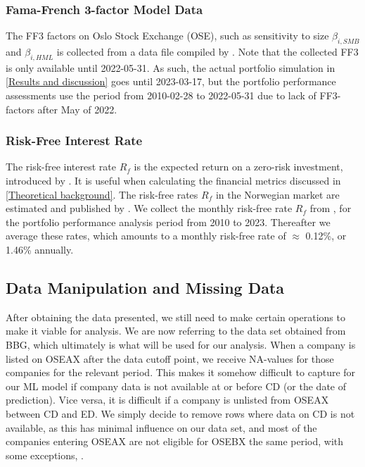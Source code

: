 \subsubsection{Fama-French 3-factor Model Data}

The FF3 factors on Oslo Stock Exchange (OSE), such as sensitivity to size $\beta_{i,SMB}$ and $\beta_{i,HML}$ is collected from a data file compiled by \textcite{bernt-fama-french}. Note that the collected FF3 is only available until 2022-05-31. As such, the actual portfolio simulation in \autoref{Results and discussion} goes until 2023-03-17, but the portfolio performance assessments use the period from 2010-02-28 to 2022-05-31 due to lack of FF3-factors after May of 2022.

\subsubsection{Risk-Free Interest Rate}

The risk-free interest rate $R_f$ is the expected return on a zero-risk investment, introduced by \textcite{irving-theory-of-interest}. It is useful when calculating the financial metrics discussed in \autoref{Theoretical background}. The risk-free rates $R_f$ in the Norwegian market are estimated and published by \textcite{bernt-risk-free}. We collect the monthly risk-free rate $R_f$ from \textcite{bernt-risk-free}, for the portfolio performance analysis period from 2010 to 2023. Thereafter we average these rates, which amounts to a monthly risk-free rate of $\approx$ 0.12\%, or 1.46\% annually. 

\subsection{Data Manipulation and Missing Data}
After obtaining the data presented, we still need to make certain operations to make it viable for analysis. We are now referring to the data set obtained from BBG, which ultimately is what will be used for our analysis. When a company is listed on OSEAX after the data cutoff point, we receive NA-values for those companies for the relevant period. This makes it somehow difficult to capture for our ML model if company data is not available at or before CD (or the date of prediction). Vice versa, it is difficult if a company is unlisted from OSEAX between CD and ED. We simply decide to remove rows where data on CD is not available, as this has minimal influence on our data set, and most of the companies entering OSEAX are not eligible for OSEBX the same period, with some exceptions, \parencite{OSEBX-rule-book}.

